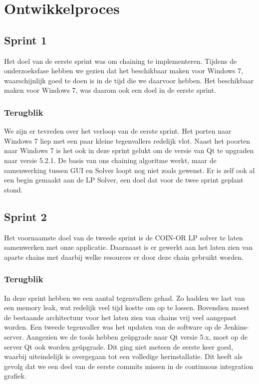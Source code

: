 \section{Ontwikkelproces}

\subsection{Sprint 1}
Het doel van de eerste sprint was om chaining te implementeren. Tijdens de onderzoeksfase hebben we gezien dat het beschikbaar maken voor Windows 7, waarschijnlijk goed te doen is in de tijd die we daarvoor hebben. Het beschikbaar maken voor Windows 7, was daarom ook een doel in de eerste sprint. 

\subsubsection*{Terugblik}
We zijn er tevreden over het verloop van de eerste sprint. Het porten naar Windows 7 liep met een paar kleine tegenvallers redelijk vlot. Naast het poorten naar Windows 7 is het ook in deze sprint gelukt om de versie van Qt te upgraden naar versie 5.2.1. De basis van ons chaining algoritme werkt, maar de samenwerking tussen GUI en Solver loopt nog niet zoals gewenst. Er is zelf ook al een begin gemaakt aan de LP Solver, een doel dat voor de twee sprint geplant stond. 

\subsection{Sprint 2}
Het voornaamste doel van de tweede sprint is de COIN-OR LP solver te laten samenwerken met onze applicatie. Daarnaast is er gewerkt aan het laten zien van aparte chains met daarbij welke resources er door deze chain gebruikt worden. 

\subsubsection*{Terugblik}
In deze sprint hebben we een aantal tegenvallers gehad. Zo hadden we last van een memory leak, wat redelijk veel tijd kostte om op te lossen. Bovendien moest de bestaande architectuur voor het laten zien van chains vrij veel aangepast worden. Een tweede tegenvaller was het updaten van de software op de Jenkins-server. Aangezien we de tools hebben ge\"upgrade naar Qt versie 5.x, moet op de server Qt ook worden ge\"upgrade. Dit ging niet meteen de eerste keer goed, waarbij uiteindelijk is overgegaan tot een volledige herinstallatie. Dit heeft als gevolg dat we een deel van de eerste commits missen in de continuous integration grafiek.

